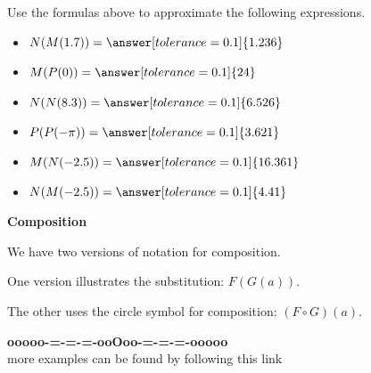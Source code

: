\documentclass{ximera}
\begin{document}
\begin{question}


Use the formulas above to approximate the following expressions.



\begin{itemize}

\item $N(M(1.7)) = \answer[tolerance=0.1]{1.236}$ 

\item $M(P(0)) = \answer[tolerance=0.1]{24}$ 

\item $N(N(8.3)) = \answer[tolerance=0.1]{6.526}$ 

\item $P(P(-\pi)) = \answer[tolerance=0.1]{3.621}$ 

\item $M(N(-2.5)) = \answer[tolerance=0.1]{16.361}$ 

\item $N(M(-2.5)) = \answer[tolerance=0.1]{4.41}$ 

\end{itemize}



\end{question}








\begin{notation} \textbf{\textcolor{red!50!green}{Composition}}

We have two versions of notation for composition.

One version illustrates the substitution: $F(G(a))$.

The other uses the circle symbol for composition: $(F \circ G)(a)$.


\end{notation}










\begin{onlineOnly}
\begin{center}
\textbf{\textcolor{green!50!black}{ooooo-=-=-=-ooOoo-=-=-=-ooooo}} \\

more examples can be found by following this link\\ 

\end{center}
\end{onlineOnly}
\end{document}
